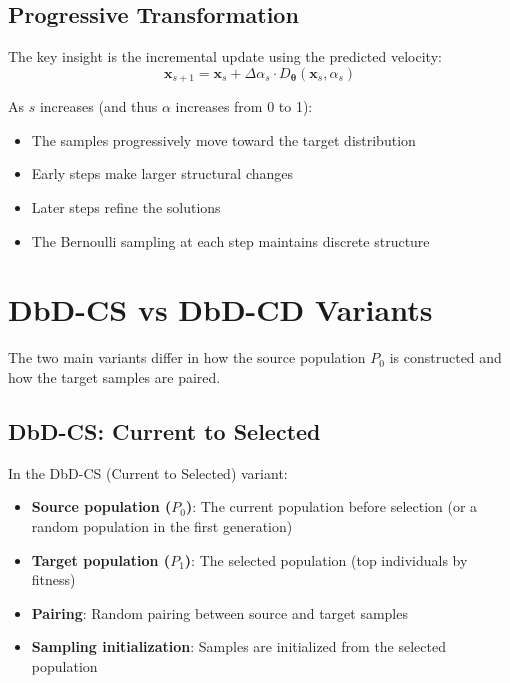 \documentclass[11pt,a4paper]{article}
\newcommand{\vx}{\mathbf{x}}
\newcommand{\vtheta}{\boldsymbol{\theta}}
\begin{document}
\subsection{Progressive Transformation}

The key insight is the incremental update using the predicted velocity:
\begin{equation}
    \vx_{s+1} = \vx_s + \Delta\alpha_s \cdot D_\vtheta(\vx_s, \alpha_s)
\end{equation}

As $s$ increases (and thus $\alpha$ increases from 0 to 1):
\begin{itemize}
    \item The samples progressively move toward the target distribution
    \item Early steps make larger structural changes
    \item Later steps refine the solutions
    \item The Bernoulli sampling at each step maintains discrete structure
\end{itemize}

\section{DbD-CS vs DbD-CD Variants}

The two main variants differ in how the source population $P_0$ is constructed and how the target samples are paired.

\subsection{DbD-CS: Current to Selected}

In the DbD-CS (Current to Selected) variant:

\begin{itemize}
    \item \textbf{Source population ($P_0$)}: The current population before selection (or a random population in the first generation)
    \item \textbf{Target population ($P_1$)}: The selected population (top individuals by fitness)
    \item \textbf{Pairing}: Random pairing between source and target samples
    \item \textbf{Sampling initialization}: Samples are initialized from the selected population
\end{itemize}
\end{document}

